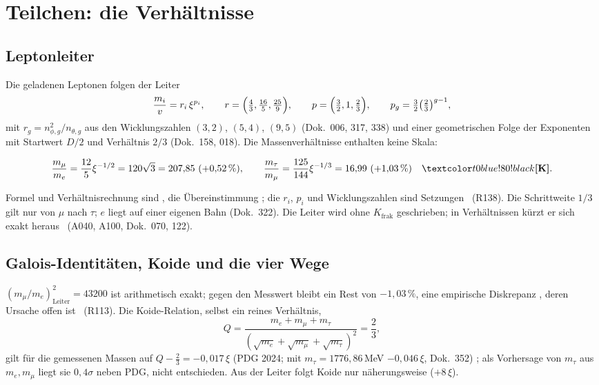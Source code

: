 \section{Teilchen: die Verhältnisse}

\subsection{Leptonleiter}

Die geladenen Leptonen folgen der Leiter
\begin{equation}
  \frac{m_i}{v}=r_i\,\xi^{p_i},\qquad r=\Bigl(\tfrac43,\tfrac{16}{5},\tfrac{25}{9}\Bigr),\qquad
  p=\Bigl(\tfrac32,1,\tfrac23\Bigr),\qquad p_g=\tfrac32\bigl(\tfrac23\bigr)^{g-1},
\end{equation}
mit $r_g=n_{\phi,g}^2/n_{\theta,g}$ aus den Wicklungszahlen $(3,2)$, $(5,4)$, $(9,5)$
(Dok.~006, 317, 338) und einer geometrischen Folge der Exponenten mit Startwert $D/2$ und
Verhältnis $2/3$ (Dok.~158, 018). Die Massenverhältnisse enthalten keine Skala:
\begin{ffkern}
\begin{equation}
  \frac{m_\mu}{m_e}=\frac{12}{5}\xi^{-1/2}=120\sqrt3=207{,}85\ (+0{,}52\,\%),\qquad
  \frac{m_\tau}{m_\mu}=\frac{125}{144}\xi^{-1/3}=16{,}99\ (+1{,}03\,\%)\quad\KM .
\end{equation}
\end{ffkern}%
Formel und Verhältnisrechnung sind \BM, die Übereinstimmung \KM; die $r_i$, $p_i$ und
Wicklungszahlen sind Setzungen \SM\ (R138). Die Schrittweite $1/3$ gilt nur von $\mu$ nach $\tau$;
$e$ liegt auf einer eigenen Bahn (Dok.~322). Die Leiter wird ohne $K_{\text{frak}}$ geschrieben;
in Verhältnissen kürzt er sich exakt heraus \BM\ (A040, A100, Dok.~070, 122).

\subsection{Galois-Identitäten, Koide und die vier Wege}

$(m_\mu/m_e)^2_{\text{Leiter}}=43200$ ist arithmetisch exakt; gegen den Messwert bleibt ein Rest
von $-1{,}03\,\%$, eine empirische Diskrepanz \KM, deren Ursache offen ist \SM\ (R113). Die
Koide-Relation, selbst ein reines Verhältnis,
\begin{equation}
  Q=\frac{m_e+m_\mu+m_\tau}{(\sqrt{m_e}+\sqrt{m_\mu}+\sqrt{m_\tau})^2}=\frac23 ,
\end{equation}
gilt für die gemessenen Massen auf $Q-\tfrac23=-0{,}017\,\xi$ (PDG 2024; mit
$m_\tau=1776{,}86$\,MeV $-0{,}046\,\xi$, Dok.~352) \KM; als Vorhersage von $m_\tau$ aus $m_e,m_\mu$
liegt sie $0{,}4\sigma$ neben PDG, nicht entschieden. Aus der Leiter folgt Koide nur
näherungsweise ($+8\,\xi$).


